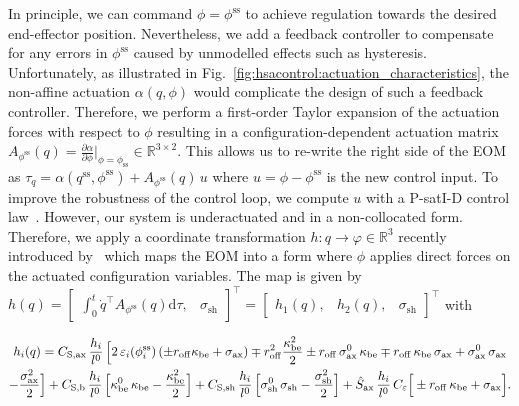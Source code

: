 In principle, we can command $\phi = \phi^\mathrm{ss}$ to achieve regulation towards the desired end-effector position.
Nevertheless, we add a feedback controller to compensate for any errors in $\phi^\mathrm{ss}$ caused by unmodelled effects such as hysteresis. Unfortunately, as illustrated in Fig.~\ref{fig:hsacontrol:actuation_characteristics}, the non-affine actuation $\alpha(q,\phi)$ would complicate the design of such a feedback controller.
Therefore, we perform a first-order Taylor expansion of the actuation forces with respect to $\phi$ resulting in a configuration-dependent actuation matrix $A_{\phi^\mathrm{ss}}(q) = \frac{\partial \alpha}{\partial \phi} \big|_{\phi = \phi_\mathrm{ss}} \in \mathbb{R}^{3 \times 2}$. This allows us to re-write the right side of the \gls{EOM} as $\tau_q = \alpha(q^\mathrm{ss}, \phi^\mathrm{ss}) + A_{\phi^\mathrm{ss}}(q) \, u$ where $u = \phi - \phi^\mathrm{ss}$ is the new control input.
To improve the robustness of the control loop, we compute $u$ with a P-satI-D control law~\citep{pustina2022p}. However, our system is underactuated and in a non-collocated form.
Therefore, we apply a coordinate transformation $h: q \rightarrow \varphi \in \mathbb{R}^3$ recently introduced by~\citet{pustina2024input} which maps the \gls{EOM} into a form where $\phi$ applies direct forces on the actuated configuration variables. The map is given by { $h(q) = \begin{bmatrix}
    \int_0^t \dot{q}^\top A_{\phi^\mathrm{ss}}(q) \mathrm{d}\tau, & \sigma_\mathrm{sh}
\end{bmatrix}^\top = \begin{bmatrix}
    h_1(q), & h_2(q), & \sigma_\mathrm{sh}
\end{bmatrix}^\top$}
with
\begin{footnotesize}
\begin{multline}\footnotesize
    h_i(q) = 
    C_{\mathrm{S},\mathrm{ax}} \, \frac{h_i}{l^0} \, \Big [ 2 \, \varepsilon_i(\phi^\mathrm{ss}_i) \left ( \pm r_\mathrm{off} \kappa_\mathrm{be} + \sigma_\mathrm{ax} \right ) \mp r_\mathrm{off}^2 \frac{\kappa_\mathrm{be}^2}{2} \pm r_\mathrm{off} \, \sigma_\mathrm{ax}^0 \, \kappa_\mathrm{be} \mp r_\mathrm{off} \, \kappa_\mathrm{be} \, \sigma_\mathrm{ax} + \sigma_\mathrm{ax}^0 \, \sigma_\mathrm{ax}\\ - \frac{\sigma_\mathrm{ax}^2}{2} \Big ] 
    + C_{\mathrm{S},\mathrm{b}} \, \frac{h_i}{l^0} \, \Big [ \kappa_\mathrm{be}^0 \, \kappa_\mathrm{be} - \frac{\kappa_\mathrm{be}^2}{2} \Big ] 
    + C_{\mathrm{S},\mathrm{sh}} \, \frac{h_i}{l^0} \, \Big [\sigma_\mathrm{sh}^0 \, \sigma_\mathrm{sh} - \frac{\sigma_\mathrm{sh}^2}{2} \Big ]
    + \hat{S}_\mathrm{ax} \, \frac{h_i}{l^0} \, C_\varepsilon \Big [ \pm r_\mathrm{off} \, \kappa_\mathrm{be} + \sigma_\mathrm{ax} \Big ].
\end{multline}
\end{footnotesize}
